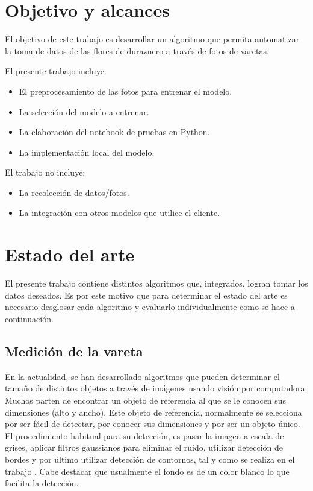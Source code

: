 \section{Objetivo y alcances}

El objetivo de este trabajo es desarrollar un algoritmo que permita automatizar la toma de datos de las flores de duraznero a través de fotos de varetas.

El presente trabajo incluye:
\begin{itemize}
	\item El preprocesamiento de las fotos para entrenar el modelo.
	\item La selección del modelo a entrenar.
	\item La elaboración del notebook de pruebas en Python.
	\item La implementación local del modelo.
\end{itemize}

El trabajo no incluye:
\begin{itemize}
	\item La recolección de datos/fotos.
	\item La integración con otros modelos que utilice el cliente.
\end{itemize}



\section{Estado del arte}

El presente trabajo contiene distintos algoritmos que, integrados, logran tomar los datos deseados. Es por este motivo que para determinar el estado del arte es necesario desglosar cada algoritmo y evaluarlo individualmente como se hace a continuación.

\subsection{Medición de la vareta}

En la actualidad, se han desarrollado algoritmos que pueden determinar el tamaño de distintos objetos a través de imágenes usando visión por computadora. Muchos parten de encontrar un objeto de referencia al que se le conocen sus dimensiones (alto y ancho). Este objeto de referencia, normalmente se selecciona por ser fácil de detectar, por conocer sus dimensiones y por ser un objeto único. El procedimiento habitual para su detección, es pasar la imagen a escala de grises, aplicar filtros gaussianos para eliminar el ruido, utilizar detección de bordes y por último utilizar detección de contornos, tal y como se realiza en el trabajo \cite{ARTICLE:2}. Cabe destacar que usualmente el fondo es de un color blanco lo que facilita la detección.


